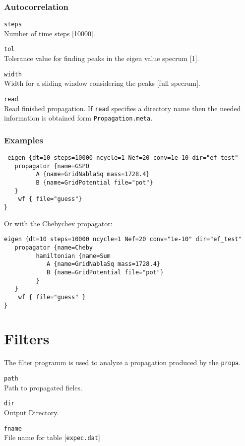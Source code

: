 \documentclass[a4paper,12pt]{scrbook}
\newcommand{\option}[2]{\item \texttt{#1}\\ #2}
\newcommand{\code}[1]{\texttt{#1}}
\begin{document}
\subsubsection*{Autocorrelation}
\begin{options}
\option{steps}{Number of time steps [10000].}
\option{tol}{Tolerance value for finding peaks in the eigen value specrum [1].}
\option{width}{Width for a sliding window considering the peaks [full specrum].}
\option{read}{Read finished propagation. If \code{read} specifies a directory name then the needed information is obtained form \code{Propagation.meta}.}
\end{options}


\subsubsection*{Examples}
\begin{verbatim}
 eigen {dt=10 steps=10000 ncycle=1 Nef=20 conv=1e-10 dir="ef_test"
   propagator {name=GSPO
         A {name=GridNablaSq mass=1728.4}
         B {name=GridPotential file="pot"}
   }
    wf { file="guess"}
}
\end{verbatim}
Or with the Chebychev propagator:
\begin{verbatim}
eigen {dt=10 steps=10000 ncycle=1 Nef=20 conv="1e-10" dir="ef_test"
   propagator {name=Cheby
         hamiltonian {name=Sum
            A {name=GridNablaSq mass=1728.4}
            B {name=GridPotential file="pot"}
         }
   }
    wf { file="guess" }
}
\end{verbatim}


\section{Filters}
The filter programm is used to analyze a propagation produced by the \verb|propa|.
\begin{options}
\option{path}{Path to propagated fieles.}
\option{dir}{Output Directory.}
\option{fname}{File name for table [\code{expec.dat}]}
\end{options}
\end{document}
